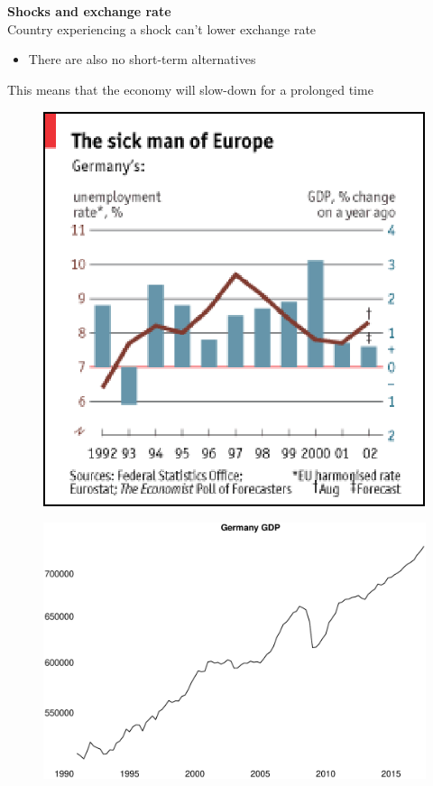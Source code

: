 \documentclass{beamer}
\begin{document}
\begin{frame}
  \textbf{Shocks and exchange rate}\\
  Country experiencing a shock can't lower exchange rate
  \begin{itemize}
    \item There are also no short-term alternatives
  \end{itemize}
  This means that the economy will slow-down for a prolonged time  
  \begin{figure}
    \includegraphics[scale=.4]{sick_man.eps}
  \end{figure}
\end{frame}

\begin{frame}
  \begin{figure}
    \includegraphics[scale=.3]{germany_gdp.eps}
  \end{figure}
\end{frame}
\end{document}
